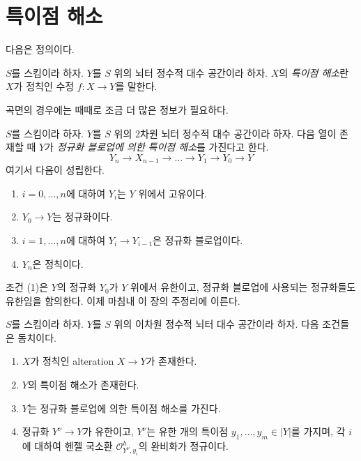 \section{특이점 해소}
\label{section-resolution}

\noindent
다음은 정의이다.

\begin{definition}
\label{definition-resolution}
$S$를 스킴이라 하자. $Y$를 $S$ 위의 뇌터 정수적 대수 공간이라 하자.
$X$의 {\it 특이점 해소}란 $X$가 정칙인 수정
$f : X \to Y$를 말한다.
\end{definition}

\noindent
곡면의 경우에는 때때로 조금 더 많은 정보가 필요하다.

\begin{definition}
\label{definition-resolution-surface}
$S$를 스킴이라 하자. $Y$를 $S$ 위의 $2$차원 뇌터 정수적 대수 공간이라 하자.
다음 열이 존재할 때 $Y$가
{\it 정규화 블로업에 의한 특이점 해소}를 가진다고 한다.
$$
Y_n \to X_{n - 1} \to \ldots \to Y_1 \to Y_0 \to Y
$$
여기서 다음이 성립한다.
\begin{enumerate}
\item $i = 0, \ldots, n$에 대하여 $Y_i$는 $Y$ 위에서 고유이다.
\item $Y_0 \to Y$는 정규화이다.
\item $i = 1, \ldots, n$에 대하여
$Y_i \to Y_{i - 1}$은 정규화 블로업이다.
\item $Y_n$은 정칙이다.
\end{enumerate}
\end{definition}

\noindent
조건 (1)은 $Y$의 정규화 $Y_0$가 $Y$ 위에서 유한이고,
정규화 블로업에 사용되는 정규화들도 유한임을 함의한다.
이제 마침내 이 장의 주정리에 이른다.

\begin{theorem}
\label{theorem-resolve}
$S$를 스킴이라 하자. $Y$를 $S$ 위의 이차원 정수적
뇌터 대수 공간이라 하자. 다음 조건들은 동치이다.
\begin{enumerate}
\item $X$가 정칙인 alteration $X \to Y$가 존재한다.
\item $Y$의 특이점 해소가 존재한다.
\item $Y$는 정규화 블로업에 의한 특이점 해소를 가진다.
\item 정규화 $Y^\nu \to Y$가 유한이고, $Y^\nu$는 유한 개의 특이점
$y_1, \ldots, y_m \in |Y|$를 가지며, 각 $i$에 대하여
헨젤 국소환 $\mathcal{O}_{Y^\nu, y_i}^h$의 완비화가 정규이다.
\end{enumerate}
\end{theorem}

